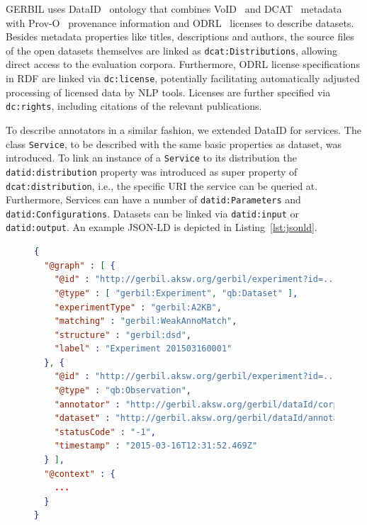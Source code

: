 GERBIL uses DataID~\cite{dataID} ontology that combines VoID~\cite{void} and DCAT~\cite{dcat} metadata with Prov-O~\cite{prov-o} provenance information and ODRL~\cite{odrl} licenses to describe datasets.
Besides metadata properties like titles, descriptions and authors, the source files of the open datasets themselves are linked as \texttt{dcat:Distributions}, allowing direct access to the evaluation corpora. 
Furthermore, ODRL license specifications in \ac{RDF} are linked via \texttt{dc:license}, potentially facilitating automatically adjusted processing of licensed data by \ac{NLP} tools. 
Licenses are further specified via \texttt{dc:rights}, including citations of the relevant publications. 

To describe annotators in a similar fashion, we extended DataID for services. 
The class \texttt{Service}, to be described with the same basic properties as dataset, was introduced. 
To link an instance of a \texttt{Service} to its distribution the \texttt{datid:distribution} property was introduced as super property of \texttt{dcat:distribution}, i.e., the specific URI the service can be queried at.
Furthermore, Services can have a number of \texttt{datid:Parameters} and \texttt{datid:Configurations}.
Datasets can be linked via \texttt{datid:input} or \texttt{datid:output}. 
An example JSON-LD is depicted in Listing~\ref{lst:jsonld}.


\begin{figure}[ht!]
\begin{lstlisting}[label=lst:jsonld, caption=Example JSON-LD for an GERBIL experiment.,language=json]
{
  "@graph" : [ {
    "@id" : "http://gerbil.aksw.org/gerbil/experiment?id=...\#experiment_...",
    "@type" : [ "gerbil:Experiment", "qb:Dataset" ],
    "experimentType" : "gerbil:A2KB",
    "matching" : "gerbil:WeakAnnoMatch",
    "structure" : "gerbil:dsd",
    "label" : "Experiment 201503160001"
  }, {
    "@id" : "http://gerbil.aksw.org/gerbil/experiment?id=...\#experiment_..._task_0",
    "@type" : "qb:Observation",
    "annotator" : "http://gerbil.aksw.org/gerbil/dataId/corpora/Babelfy",
    "dataset" : "http://gerbil.aksw.org/gerbil/dataId/annotators/ACE2004",
    "statusCode" : "-1",
    "timestamp" : "2015-03-16T12:31:52.469Z"
  } ],
  "@context" : {
    ...
  }
}
\end{lstlisting}
\end{figure}


